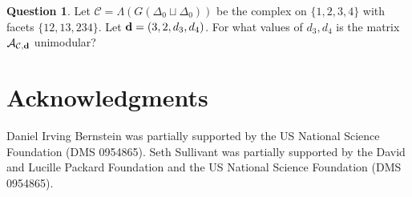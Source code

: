 \documentclass[letterpaper,12pt]{amsart}
\theoremstyle{plain}
\theoremstyle{definition}
\newtheorem{ques}[thm]{Question}
\theoremstyle{remark}
\begin{document}
\begin{ques}
	Let $\mathcal{C} = \Lambda(G(\Delta_0 \sqcup \Delta_0))$ be the complex on $\{1,2,3,4\}$ with facets $\{12,13,234\}$.
	Let ${\bf d} = (3,2,d_{3},d_{4})$.
	For what values of $d_{3},d_{4}$ is the matrix $\mathcal{A}_{\mathcal{C},{\bf d}}$ unimodular?
\end{ques}
















\section*{Acknowledgments}
Daniel Irving Bernstein was partially supported by the US National Science Foundation (DMS 0954865).
Seth Sullivant was partially supported by the David and Lucille Packard 
Foundation and the US National Science Foundation (DMS 0954865). 




\end{document}
